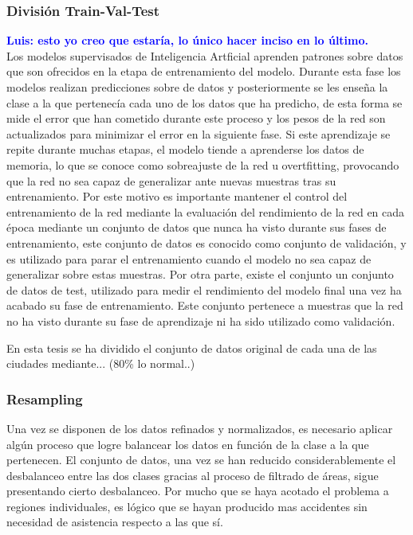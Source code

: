 \documentclass{uathesis-es}
\begin{document}
{	
	\subsubsection{División Train-Val-Test}
	
	\textcolor{blue}{\textbf{Luis: esto yo creo que estaría, lo único hacer inciso en lo último.}}\\
	
	Los modelos supervisados de Inteligencia Artficial aprenden patrones sobre datos que son ofrecidos en la etapa de entrenamiento del modelo. Durante esta fase los modelos realizan predicciones sobre de datos y posteriormente se les enseña la clase a la que pertenecía cada uno de los datos que ha predicho, de esta forma se mide el error que han cometido durante este proceso y los pesos de la red son actualizados para minimizar el error en la siguiente fase. Si este aprendizaje se repite durante muchas etapas, el modelo tiende a aprenderse los datos de memoria, lo que se conoce como sobreajuste de la red u overtfitting, provocando que la red no sea capaz de generalizar ante nuevas muestras tras su entrenamiento. Por este motivo es importante mantener el control del entrenamiento de la red mediante la evaluación del rendimiento de la red en cada época mediante un conjunto de datos que nunca ha visto durante sus fases de entrenamiento, este conjunto de datos es conocido como conjunto de validación, y es utilizado para parar el entrenamiento cuando el modelo no sea capaz de generalizar sobre estas muestras. Por otra parte, existe el conjunto un conjunto de datos de test, utilizado para medir el rendimiento del modelo final una vez ha acabado su fase de entrenamiento. Este conjunto pertenece a muestras que la red no ha visto durante su fase de aprendizaje ni ha sido utilizado como validación.
	
	En esta tesis se ha dividido el conjunto de datos original de cada una de las ciudades mediante... (80\% lo normal..)
	
	\subsubsection{Resampling}
	
	Una vez se disponen de los datos refinados y normalizados, es necesario aplicar algún proceso que logre balancear los datos en función de la clase a la que pertenecen. El conjunto de datos, una vez se han reducido considerablemente el desbalanceo entre las dos clases gracias al proceso de filtrado de áreas, sigue presentando cierto desbalanceo. Por mucho que se haya acotado el problema a regiones individuales, es lógico que se hayan producido mas accidentes sin necesidad de asistencia respecto a las que sí.
	
}
\end{document}
